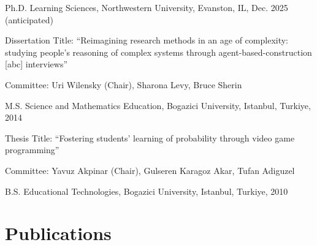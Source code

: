 \documentclass[11pt,letterpaper]{report} %
\begin{document}
    \begin{tablist}

        \item[Ph.D.] \tab{}Learning Sciences, Northwestern University, Evanston, IL, {\small Dec.} 2025  {\footnotesize (anticipated)} \\

        \vspace{4pt}

        {\small Dissertation Title: \enquote{Reimagining research methods in an age of complexity: studying people’s reasoning of complex systems through agent-based-construction [abc] interviews}} \\

        \vspace{4pt}

        {\small Committee: Uri Wilensky (Chair), Sharona Levy, Bruce Sherin} \\

        \vspace{8pt}

        \item[M.S.]  \tab{}Science and Mathematics Education, Bogazici University, Istanbul, Turkiye, 2014 \\

        \vspace{4pt}

        {\small Thesis Title: \enquote{Fostering students' learning of probability through video game programming}} \\

        \vspace{4pt}

        {\small Committee: Yavuz Akpinar (Chair), Gulseren Karagoz Akar, Tufan Adiguzel}

        \vspace{8pt}

        \item[B.S.]  \tab{}Educational Technologies, Bogazici University, Istanbul, Turkiye, 2010

    \end{tablist}



    \section*{Publications}
\end{document}
